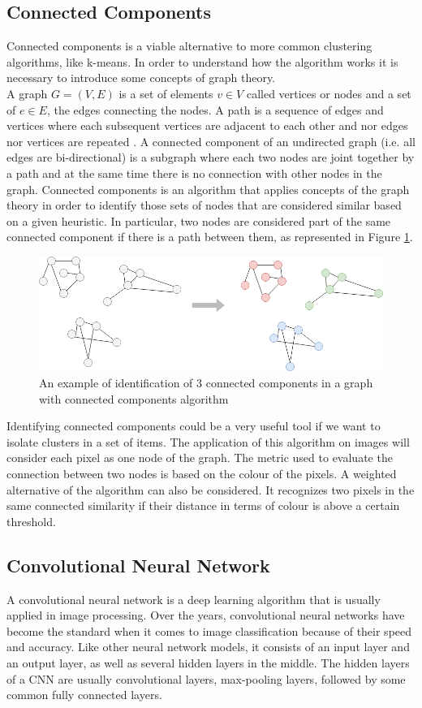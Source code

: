 \documentclass{usiinftr}
\begin{document}
\subsection{Connected Components}
Connected components is a viable alternative to more common clustering algorithms, like k-means. In order to understand how the algorithm works it is necessary to introduce some concepts of graph theory. \\
A graph $G=(V,E)$ is a set of elements $v \in V$ called vertices or nodes and a set of $e \in E$, the edges connecting the nodes. A path is a sequence of edges and vertices where each subsequent vertices are adjacent to each other and nor edges nor vertices are repeated \cite{12}. 
A connected component of an undirected graph (i.e. all edges are bi-directional)  is a subgraph where each two nodes are joint together by a path and at the same time  there is no connection with other nodes in the graph. 
Connected components is an algorithm that applies concepts of the graph theory in order to identify those sets of nodes that are considered similar based on a given heuristic. In particular, two nodes are considered part of the same connected component if there is a path between them, as represented in Figure \ref{fig:2}. \\
\begin{figure}[h]
	\centering
	\includegraphics[width=0.6\linewidth]{img/conn_comp}
	\caption{An example of identification of 3 connected components in a graph with connected components algorithm}
	\label{fig:2}
\end{figure}
\newpage
\noindent
Identifying connected components could be a very useful tool if we want to isolate clusters in a set of items. 
The application of this algorithm on images will consider each pixel as one node of the graph. The metric used to evaluate the connection between two nodes is based on the colour of the pixels. A weighted alternative of the algorithm can also be considered. It recognizes two pixels in the same connected similarity if their distance in terms of colour is above a certain threshold.\\



\subsection{Convolutional Neural Network}
A convolutional neural network is a deep learning algorithm that is usually applied in image processing.
Over the years, convolutional neural networks have become the standard when it comes to image classification because of their speed and accuracy.
Like other neural network models, it consists of an input layer and an output layer, as well as several hidden layers in the middle.
The hidden layers of a CNN are usually convolutional layers, max-pooling layers, followed by some common fully connected layers.
\end{document}
